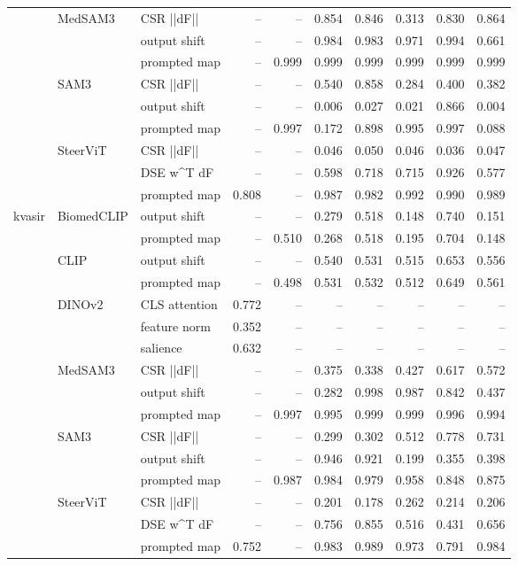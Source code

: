 \begin{tabular}{lllrrrrrrr}
\cline{2-10}
 & \multirow[t]{3}{*}{MedSAM3} & CSR  ||dF|| & -- & -- & 0.854 & 0.846 & 0.313 & 0.830 & 0.864 \\
 &  & output shift & -- & -- & 0.984 & 0.983 & 0.971 & 0.994 & 0.661 \\
 &  & prompted map & -- & 0.999 & 0.999 & 0.999 & 0.999 & 0.999 & 0.999 \\
\cline{2-10}
 & \multirow[t]{3}{*}{SAM3} & CSR  ||dF|| & -- & -- & 0.540 & 0.858 & 0.284 & 0.400 & 0.382 \\
 &  & output shift & -- & -- & 0.006 & 0.027 & 0.021 & 0.866 & 0.004 \\
 &  & prompted map & -- & 0.997 & 0.172 & 0.898 & 0.995 & 0.997 & 0.088 \\
\cline{2-10}
 & \multirow[t]{3}{*}{SteerViT} & CSR  ||dF|| & -- & -- & 0.046 & 0.050 & 0.046 & 0.036 & 0.047 \\
 &  & DSE  w^T dF & -- & -- & 0.598 & 0.718 & 0.715 & 0.926 & 0.577 \\
 &  & prompted map & 0.808 & -- & 0.987 & 0.982 & 0.992 & 0.990 & 0.989 \\
\cline{1-10} \cline{2-10}
\multirow[t]{16}{*}{kvasir} & \multirow[t]{2}{*}{BiomedCLIP} & output shift & -- & -- & 0.279 & 0.518 & 0.148 & 0.740 & 0.151 \\
 &  & prompted map & -- & 0.510 & 0.268 & 0.518 & 0.195 & 0.704 & 0.148 \\
\cline{2-10}
 & \multirow[t]{2}{*}{CLIP} & output shift & -- & -- & 0.540 & 0.531 & 0.515 & 0.653 & 0.556 \\
 &  & prompted map & -- & 0.498 & 0.531 & 0.532 & 0.512 & 0.649 & 0.561 \\
\cline{2-10}
 & \multirow[t]{3}{*}{DINOv2} & CLS attention & 0.772 & -- & -- & -- & -- & -- & -- \\
 &  & feature norm & 0.352 & -- & -- & -- & -- & -- & -- \\
 &  & salience & 0.632 & -- & -- & -- & -- & -- & -- \\
\cline{2-10}
 & \multirow[t]{3}{*}{MedSAM3} & CSR  ||dF|| & -- & -- & 0.375 & 0.338 & 0.427 & 0.617 & 0.572 \\
 &  & output shift & -- & -- & 0.282 & 0.998 & 0.987 & 0.842 & 0.437 \\
 &  & prompted map & -- & 0.997 & 0.995 & 0.999 & 0.999 & 0.996 & 0.994 \\
\cline{2-10}
 & \multirow[t]{3}{*}{SAM3} & CSR  ||dF|| & -- & -- & 0.299 & 0.302 & 0.512 & 0.778 & 0.731 \\
 &  & output shift & -- & -- & 0.946 & 0.921 & 0.199 & 0.355 & 0.398 \\
 &  & prompted map & -- & 0.987 & 0.984 & 0.979 & 0.958 & 0.848 & 0.875 \\
\cline{2-10}
 & \multirow[t]{3}{*}{SteerViT} & CSR  ||dF|| & -- & -- & 0.201 & 0.178 & 0.262 & 0.214 & 0.206 \\
 &  & DSE  w^T dF & -- & -- & 0.756 & 0.855 & 0.516 & 0.431 & 0.656 \\
 &  & prompted map & 0.752 & -- & 0.983 & 0.989 & 0.973 & 0.791 & 0.984 \\
\cline{1-10} \cline{2-10}
\bottomrule
\end{tabular}

